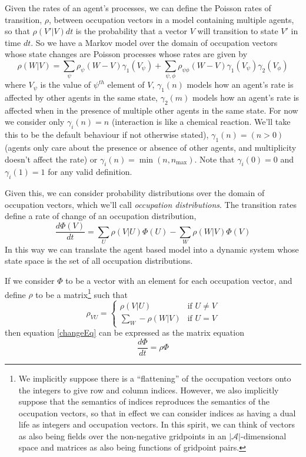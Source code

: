 \documentclass[a4paper]{article}
\begin{document}
Given the rates of an agent's processes, we can define the Poisson rates of transition, $\rho$, between occupation vectors in a model containing multiple agents, so that $\rho(V'|V)dt$ is the probability that a vector $V$ will transition to state $V'$ in time $dt$. So we have a Markov model over the domain of occupation vectors whose state changes are Poisson processes whose rates are given by 
\begin{equation}
\rho(W|V) = \sum_{\psi}  \rho_\psi(W-V) \gamma_1(V_\psi) + \sum_{\psi,\phi}  \rho_{\psi\phi}(W-V) \gamma_1(V_\psi)\gamma_2(V_\phi)
\label{rateEq}
\end{equation}
where $V_\psi$ is the value of $\psi^{th}$ element of $V$, $\gamma_1(n)$ models how an agent's rate is affected by other agents in the same state, $\gamma_2(m)$ models how an agent's rate is affected when in the presence of multiple other agents in the same state. For now we consider only $\gamma_i(n) = n$ (interaction is like a chemical reaction. We'll take this to be the default behaviour if not otherwise stated), $\gamma_1(n) = (n>0)$ (agents only care about the presence or absence of other agents, and multiplicity doesn't affect the rate) or $\gamma_i(n) = \min(n,n_{\text{max}})$. Note that $\gamma_i(0) = 0$ and $\gamma_i(1) = 1$ for any valid definition.

Given this, we can consider probability distributions over the domain of occupation vectors, which we'll call \textit{occupation distributions}. The transition rates define a rate of change of an occupation distribution,
\begin{equation}
\frac{d\Phi(V)}{dt} = \sum_{U} \rho(V|U)\Phi(U) - \sum_W \rho(W|V)\Phi(V)
\label{changeEq}
\end{equation}
In this way we can translate the agent based model into a dynamic system whose state space is the set of all occupation distributions.

If we consider $\Phi$ to be a vector with an element for each occupation vector, and define $\rho$ to be a matrix\footnote{We implicitly suppose there is a ``flattening'' of the occupation vectors onto the integers to give row and column indices. However, we also implicitly suppose that the semantics of indices reproduces the semantics of the occupation vectors, so that in effect we can consider indices as having a dual life as integers and occupation vectors. In this spirit, we can think of vectors as also being fields over the non-negative gridpoints in an $|\mathcal{A}|$-dimensional space and matrices as also being functions of gridpoint pairs.} such that
\begin{equation}
\rho_{VU} = 
\begin{cases}
	\rho(V|U) & \text{if } U \ne V\\
	\sum_{W} -\rho(W|V) & \text{if } U = V
\end{cases}
\label{rhoMatrixEq}
\end{equation}
then equation \ref{changeEq} can be expressed as the matrix equation
\begin{equation}
	\frac{d\Phi}{dt} = \rho\Phi
	\label{expChangeEq}
\end{equation}
\end{document}
